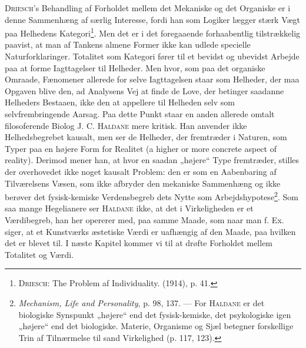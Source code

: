 \documentclass[12pt]{article}
\begin{document}
\textsc{Driesch}'s Behandling af Forholdet mellem det Mekaniske og det Organiske er
i denne Sammenhæng af særlig Interesse, fordi han som Logiker lægger stærk Vægt
paa Helhedens Kategori\footnote{%
\textsc{Driesch}: The Problem af Individuality.
(1914), p. 41.}. Men det er i det foregaaende forhaabentlig
tilstrækkelig paavist, at man af Tankens almene Former ikke kan udlede specielle
Naturforklaringer. Totalitet som Kategori fører til et bevidst og ubevidst Arbejde paa at
forme Iagttagelser til Helheder. Men hvor, som paa det organiske Omraade,
Fænomener allerede for selve Iagttagelsen staar som Helheder, der maa Opgaven blive
den, ad Analysens Vej at finde de Love, der betinger saadanne Helheders Bestaaen,
ikke den at appellere til Helheden selv som selvfrembringende Aarsag. Paa dette
Punkt staar en anden allerede omtalt filosoferende Biolog J. C. \textsc{Haldane} mere
kritisk. Han anvender ikke Helhedsbegrebet kausalt, men ser de Helheder, der
fremtræder i Naturen, som Typer paa en højere Form for Realitet (a higher or more
concrete aspect of reality). Derimod mener han, at hvor en saadan „højere“ Type
fremtræder, stilles der overhovedet ikke noget kausalt Problem: den er som en
Aabenbaring af Tilværelsens Væsen, som ikke afbryder den mekaniske Sammenhæng
og ikke berøver det fysisk-kemiske Verdensbegreb dets Nytte som
Arbejdshypotese\footnote{\textit{Mechanism, Life and Personality}, p. 98, 137.
--- For \textsc{Haldane} er det biologiske Synspunkt „højere“ end det
fysisk-kemiske, det psykologiske igen „højere“ end det biologiske. Materie,
Organisme og Sjæl betegner forskellige Trin af Tilnærmelse til sand Virkelighed
(p. 117, 123).}. Som saa mange Hegelianere ser \textsc{Haldane} ikke, at det i Virkeligheden
er et Værdibegreb, han her opererer med, paa samme Maade, som naar man f. Ex.
siger, at et Kunstværks æstetiske Værdi er uafhængig af den Maade, paa hvilken
det er blevet til. I næste Kapitel kommer vi til at drøfte Forholdet mellem Totalitet
og Værdi.
\end{document}
